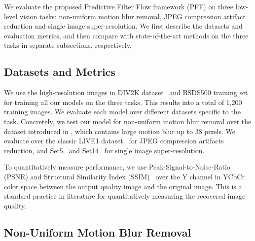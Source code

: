 \documentclass[10pt,twocolumn,letterpaper]{article}
\begin{document}
We evaluate the proposed Predictive Filter Flow framework (PFF) on three
low-level vision tasks: non-uniform motion blur removal, JPEG compression
artifact reduction and single image super-resolution.  We first describe the
datasets and evaluation metrics, and then compare with state-of-the-art methods
on the three tasks in separate subsections, respectively.

\subsection{Datasets and Metrics}
We use the high-resolution images in DIV2K dataset~\cite{Agustsson_2017_CVPR_Workshops}
and BSDS500 training set~\cite{martin2001database} for training all our models on the three tasks.
This results into a total of 1,200 training images.
We evaluate each model over different datasets specific to the task.
Concretely,
we test our model for non-uniform motion blur removal over the dataset introduced in
\cite{bahat2017non},
which contains large motion blur up to 38 pixels.
We evaluate over the classic LIVE1 dataset~\cite{wang2004image} for JPEG compression artifacts reduction,
and Set5~\cite{bevilacqua2012low} and Set14~\cite{zeyde2010single} for single image super-resolution.

To quantitatively measure performance, we use Peak-Signal-to-Noise-Ratio (PSNR)
and Structural Similarity Index
(SSIM)~\cite{wang2004image} over the Y channel in YCbCr color space between
the output quality image and the original image.
This is a standard practice in literature for quantitatively measuring the recovered image quality.





\subsection{Non-Uniform Motion Blur Removal}
\end{document}
